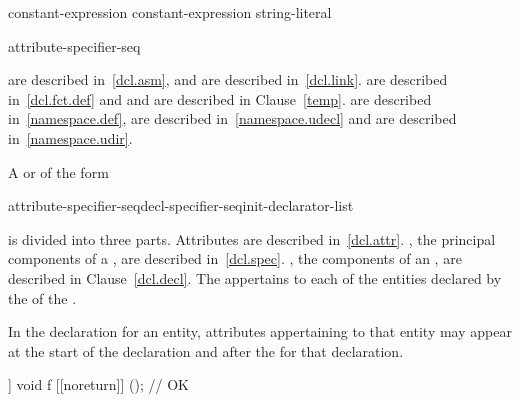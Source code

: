 \begin{bnf}
\br
   \terminal{(} constant-expression \terminal{)} \terminal{;}\br
   \terminal{(} constant-expression \terminal{,} string-literal \terminal{)} \terminal{;}
\end{bnf}

\begin{bnf}
\br
    \terminal{;}
\end{bnf}

\begin{bnf}
\br
    attribute-specifier-seq \terminal{;}
\end{bnf}

\begin{note}
 are described in~\ref{dcl.asm}, and
 are described in~\ref{dcl.link}.
 are described in~\ref{dcl.fct.def} and
 and
 are described in Clause~\ref{temp}.
 are described in~\ref{namespace.def},
 are described in~\ref{namespace.udecl} and
 are described in~\ref{namespace.udir}.
\end{note}

\pnum
A
 or
 of the form

\begin{ncsimplebnf}
attribute-specifier-seq\opt decl-specifier-seq\opt init-declarator-list\opt{} \terminal{;}
\end{ncsimplebnf}

is divided into three parts.
Attributes are described in~\ref{dcl.attr}.
, the principal components of
a , are described in~\ref{dcl.spec}.
, the components of an
, are described in Clause~\ref{dcl.decl}.
The 
appertains to each of the entities declared by
the 
of the .
\begin{note} In the declaration for an entity, attributes appertaining to that
entity may appear at the start of the declaration and after the
 for that declaration.
\end{note} \begin{example}
\begin{codeblock}
[[noreturn]] void f [[noreturn]] (); // OK
\end{codeblock}
\end{example}

